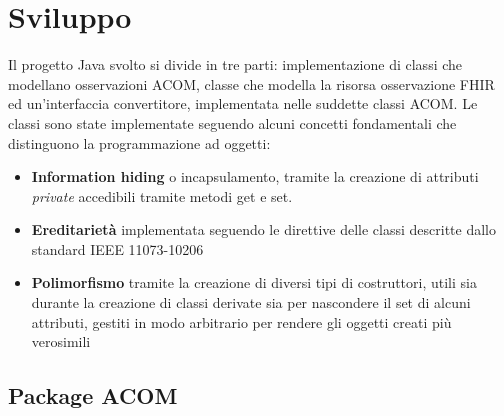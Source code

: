 \documentclass[a4paper]{article}
\begin{document}
\section{Sviluppo}
Il progetto Java svolto si divide in tre parti: implementazione di classi che modellano osservazioni ACOM,
classe che modella la risorsa osservazione FHIR ed un'interfaccia convertitore, implementata nelle suddette classi ACOM.
Le classi sono state implementate seguendo alcuni concetti fondamentali che distinguono la programmazione ad oggetti:
\begin{itemize}
    \item \textbf{Information hiding} o incapsulamento, tramite la creazione di attributi \textit{private} accedibili tramite metodi get e set.
    \item \textbf{Ereditarietà} implementata seguendo le direttive delle classi descritte dallo standard IEEE 11073-10206 
    \item \textbf{Polimorfismo} tramite la creazione di diversi tipi di costruttori, utili sia durante la creazione di classi derivate sia per nascondere il set di alcuni attributi, gestiti in modo arbitrario per rendere gli oggetti creati più verosimili
\end{itemize}
\subsection{Package ACOM}
\end{document}
